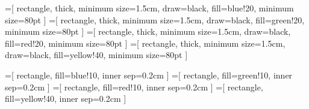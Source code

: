 \documentclass[a4paper]{article}
\begin{document}
=[
    rectangle,
    thick,
    minimum size=1.5cm,
    draw=black,
    fill=blue!20,
    minimum size=80pt
]
=[
    rectangle,
    thick,
    minimum size=1.5cm,
    draw=black,
    fill=green!20,
    minimum size=80pt
]
=[
    rectangle,
    thick,
    minimum size=1.5cm,
    draw=black,
    fill=red!20,
    minimum size=80pt
]
=[
    rectangle,
    thick,
    minimum size=1.5cm,
    draw=black,
    fill=yellow!40,
    minimum size=80pt
]

=[
    rectangle,
    fill=blue!10,
    inner sep=0.2cm
]
=[
    rectangle,
    fill=green!10,
    inner sep=0.2cm
]
=[
    rectangle,
    fill=red!10,
    inner sep=0.2cm
]
=[
    rectangle,
    fill=yellow!40,
    inner sep=0.2cm
]

\newcommand\particleblue[5]{%
    \node (#1) [particleblue]{
        \Huge${\boldsymbol{#2}}$};
    \node[below=11pt]{%
        \tiny
        \begin{tabular}{l}
        Mass: ${#3}$\\
        Charge: ${#4}$\\
        Spin: ${#5}$
        \end{tabular}
    };
}
\newcommand\particlegreen[5]{%
    \node (#1) [particlegreen]{
        \Huge${\boldsymbol{#2}}$};
    \node[below=11pt]{%
        \tiny
        \begin{tabular}{l}
        Mass: ${#3}$\\
        Charge: ${#4}$\\
        Spin: ${#5}$
        \end{tabular}
    };
}
\newcommand\particlered[5]{%
    \node (#1) [particlered]{
        \Huge${\boldsymbol{#2}}$};
    \node[below=11pt]{%
        \tiny
        \begin{tabular}{l}
        Mass: ${#3}$\\
        Charge: ${#4}$\\
        Spin: ${#5}$
        \end{tabular}
    };
}
\newcommand\particleyellow[5]{%
    \node (#1) [particleyellow]{
        \Huge${\boldsymbol{#2}}$};
    \node[below=11pt]{%
        \tiny
        \begin{tabular}{l}
        Mass: ${#3}$\\
        Charge: ${#4}$\\
        Spin: ${#5}$
        \end{tabular}
    };
}
\end{document}

